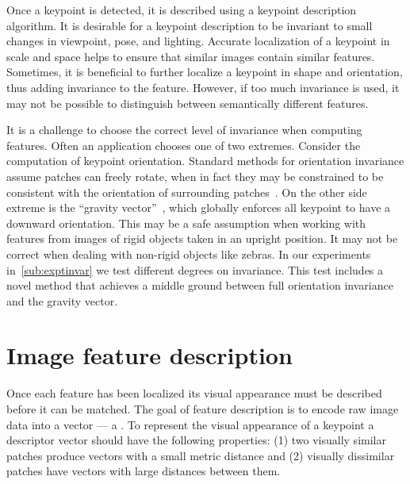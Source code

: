         Once a keypoint is detected, it is described using a keypoint description algorithm. It is desirable for a
        keypoint description to be invariant to small changes in viewpoint, pose, and lighting. Accurate
        localization of a keypoint in scale and space helps to ensure that similar images contain similar features.
        Sometimes, it is beneficial to further localize a keypoint in shape and orientation, thus adding invariance
        to the feature. However, if too much invariance is used, it may not be possible to distinguish between
        semantically different features.

        It is a challenge to choose the correct level of invariance when computing features. Often an application
        chooses one of two extremes. Consider the computation of keypoint orientation. Standard methods for
        orientation invariance assume patches can freely rotate, when in fact they may be constrained to be
        consistent with the orientation of surrounding patches~\cite{lowe_distinctive_2004}. On the other side
        extreme is the ``gravity vector''~\cite{perdoch_efficient_2009}, which globally enforces all keypoint to
        have a downward orientation. This may be a safe assumption when working with features from images of rigid
        objects taken in an upright position. It may not be correct when dealing with non-rigid objects like
        zebras.
        In our experiments in~\cref{sub:exptinvar} we test different degrees on invariance. This test includes a
        novel method that achieves a middle ground between full orientation invariance and the gravity vector.


\section{Image feature description}\label{sec:featuredescribe}  

    Once each feature has been localized its visual appearance must be described before it can be matched. The goal
    of feature description is to encode raw image data into a vector --- \ie{} a . To
    represent the visual appearance of a keypoint a descriptor vector should have the following properties: (1) two
    visually similar patches produce vectors with a small metric distance and (2) visually dissimilar patches have
    vectors with large distances between them.

